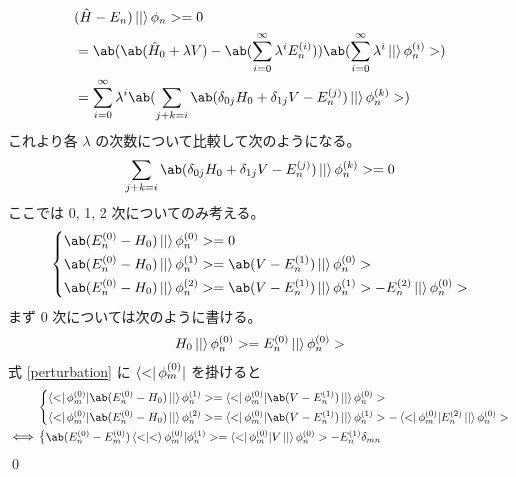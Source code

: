 \documentclass[uplatex,dvipdfmx,a4paper,11pt]{jlreq}
\makeatletter
\numberwithin{equation}{section}
\theoremstyle{definition}
\renewenvironment{proof}[1][\proofname]{\par
  \normalfont
  \topsep6\p@\@plus6\p@ \trivlist
  \item[\hskip\labelsep{\bfseries #1}\@addpunct{\bfseries}]\ignorespaces\quad\par
}{%
  \qed\endtrivlist\@endpefalse
}
\renewcommand\proofname{証明}
\makeatother
\begin{document}
\begin{proof}

  \begin{align}
     & (\hat{H} - E_n)\ket|\phi_n> = 0                                                                                                     \\
     & = \ab(\ab(\hat{H}_0 + \lambda V) - \ab(\sum_{i=0}^{\infty}\lambda^iE_n^{(i)}))\ab(\sum_{i = 0}^{\infty}\lambda^i\ket|\phi_n^{(i)}>) \\
     & = \sum_{i = 0}^{\infty}\lambda^i\ab(\sum_{j+k=i}\ab(\delta_{0j}H_0 + \delta_{1j}V - E_n^{(j)})\ket|\phi_n^{(k)}>)
  \end{align}
  これより各 $\lambda$ の次数について比較して次のようになる。
  \begin{align}
    \sum_{j+k=i}\ab(\delta_{0j}H_0 + \delta_{1j}V - E_n^{(j)})\ket|\phi_n^{(k)}> = 0
  \end{align}
  ここでは 0, 1, 2 次についてのみ考える。
  \begin{align}
    \begin{dcases}
      \ab(E_n^{(0)} - H_0)\ket|\phi_n^{(0)}> = 0                                    \\
      \ab(E_n^{(0)} - H_0)\ket|\phi_n^{(1)}> = \ab(V - E_n^{(1)})\ket|\phi_n^{(0)}> \\
      \ab(E_n^{(0)} - H_0)\ket|\phi_n^{(2)}> = \ab(V - E_n^{(1)})\ket|\phi_n^{(1)}> - E_n^{(2)}\ket|\phi_n^{(0)}>
    \end{dcases}\label{perturbation}
  \end{align}
  まず 0 次については次のように書ける。
  \begin{align}
    H_0\ket|\phi_n^{(0)}> = E_n^{(0)}\ket|\phi_n^{(0)}>
  \end{align}
  式 \eqref{perturbation} に $\bra<\phi_m^{(0)}|$ を掛けると
  \begin{align}
         & \begin{dcases}
             \bra<\phi_m^{(0)}|\ab(E_n^{(0)} - H_0)\ket|\phi_n^{(1)}> = \bra<\phi_m^{(0)}|\ab(V - E_n^{(1)})\ket|\phi_n^{(0)}> \\
             \bra<\phi_m^{(0)}|\ab(E_n^{(0)} - H_0)\ket|\phi_n^{(2)}> = \bra<\phi_m^{(0)}|\ab(V - E_n^{(1)})\ket|\phi_n^{(1)}> - \bra<\phi_m^{(0)}|E_n^{(2)}\ket|\phi_n^{(0)}>
           \end{dcases}         \\
    \iff & \begin{dcases}
             \ab(E_n^{(0)} - E_m^{(0)})\braket<\phi_m^{(0)}|\phi_n^{(1)}> = \bra<\phi_m^{(0)}|V\ket|\phi_n^{(0)}> - E_n^{(1)}\delta_{mn} \\

\end{dcases}
\end{align}
\end{proof}
\end{document}
